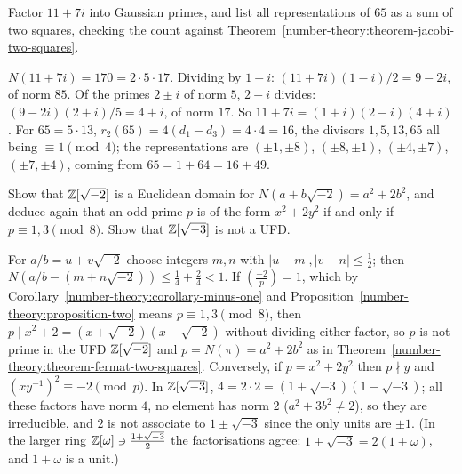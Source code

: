 \begin{exercise}\label{number-theory:exercise-gaussian-factor}
Factor $11 + 7i$ into Gaussian primes, and list all representations of $65$ as a sum of two squares, checking the count against Theorem~\ref{number-theory:theorem-jacobi-two-squares}.
\end{exercise}

\begin{solution}
$N(11 + 7i) = 170 = 2 \cdot 5 \cdot 17$. Dividing by $1 + i$: $(11 + 7i)(1 - i)/2 = 9 - 2i$, of norm $85$. Of the primes $2 \pm i$ of norm $5$, $2 - i$ divides: $(9 - 2i)(2 + i)/5 = 4 + i$, of norm $17$.
So $11 + 7i = (1 + i)(2 - i)(4 + i)$. For $65 = 5 \cdot 13$, $r_2(65) = 4(d_1 - d_3) = 4 \cdot 4 = 16$, the divisors $1, 5, 13, 65$ all being $\equiv 1 \pmod 4$; the representations are
$(\pm1, \pm8)$, $(\pm8, \pm1)$, $(\pm4, \pm7)$, $(\pm7, \pm4)$, coming from $65 = 1 + 64 = 16 + 49$.
\end{solution}

\begin{exercise}\label{number-theory:exercise-sqrt-minus-two}
Show that $\mathbb{Z}[\sqrt{-2}]$ is a Euclidean domain for $N(a + b\sqrt{-2}) = a^2 + 2b^2$, and deduce again that an odd prime $p$ is of the form $x^2 + 2y^2$ if and only if $p \equiv 1, 3 \pmod 8$. Show that
$\mathbb{Z}[\sqrt{-3}]$ is not a UFD.
\end{exercise}

\begin{solution}
For $a/b = u + v\sqrt{-2}$ choose integers $m, n$ with $|u - m|, |v - n| \leq \frac12$; then $N(a/b - (m + n\sqrt{-2})) \leq \frac14 + \frac24 < 1$. If $(\frac{-2}{p}) = 1$, which by
Corollary~\ref{number-theory:corollary-minus-one} and Proposition~\ref{number-theory:proposition-two} means $p \equiv 1, 3 \pmod 8$, then $p \mid x^2 + 2 = (x + \sqrt{-2})(x - \sqrt{-2})$ without dividing either
factor, so $p$ is not prime in the UFD $\mathbb{Z}[\sqrt{-2}]$ and $p = N(\pi) = a^2 + 2b^2$ as in Theorem~\ref{number-theory:theorem-fermat-two-squares}. Conversely, if $p = x^2 + 2y^2$ then $p \nmid y$ and
$(xy^{-1})^2 \equiv -2 \pmod p$. In $\mathbb{Z}[\sqrt{-3}]$, $4 = 2 \cdot 2 = (1 + \sqrt{-3})(1 - \sqrt{-3})$; all these factors have norm $4$, no element has norm $2$ ($a^2 + 3b^2 \neq 2$), so they are irreducible, and
$2$ is not associate to $1 \pm \sqrt{-3}$ since the only units are $\pm1$. (In the larger ring $\mathbb{Z}[\omega] \ni \frac{1 + \sqrt{-3}}{2}$ the factorisations agree: $1 + \sqrt{-3} = 2(1 + \omega)$, and $1 + \omega$ is a unit.)
\end{solution}

